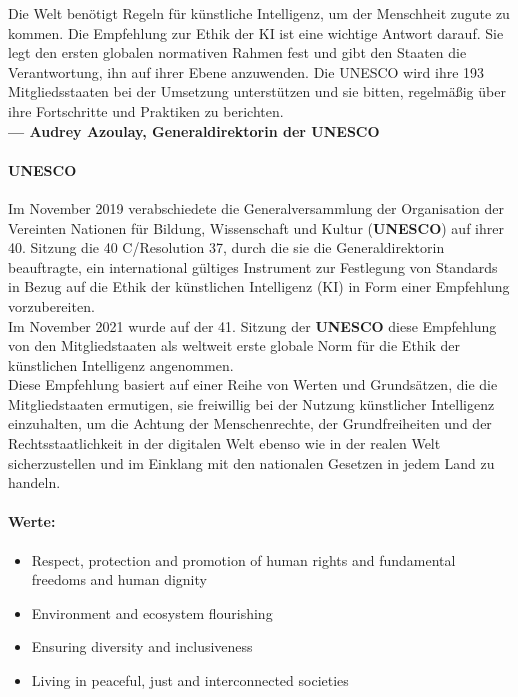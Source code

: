 \documentclass[12pt]{report}
\begin{document}


\glqq Die Welt benötigt Regeln für künstliche Intelligenz, um der Menschheit zugute zu kommen. Die Empfehlung zur Ethik der KI ist eine wichtige Antwort darauf. Sie legt den ersten globalen normativen Rahmen fest und gibt den Staaten die Verantwortung, ihn auf ihrer Ebene anzuwenden. Die UNESCO wird ihre 193 Mitgliedsstaaten bei der Umsetzung unterstützen und sie bitten, regelmäßig über ihre Fortschritte und Praktiken zu berichten.\glqq{} \\\textbf{--- Audrey Azoulay, Generaldirektorin der UNESCO}
\paragraph{UNESCO\cite{UNESCO}\\}
Im November 2019 verabschiedete die Generalversammlung der Organisation der Vereinten Nationen für Bildung, Wissenschaft und Kultur (\textbf{UNESCO}) auf ihrer 40. Sitzung die 40 C/Resolution 37, durch die sie die Generaldirektorin beauftragte, \glqq ein international gültiges Instrument zur Festlegung von Standards in Bezug auf die Ethik der künstlichen Intelligenz (KI) in Form einer Empfehlung vorzubereiten\glqq{}.\\Im November 2021 wurde auf der 41. Sitzung der \textbf{UNESCO} diese Empfehlung von den Mitgliedstaaten als weltweit erste globale Norm für die Ethik der künstlichen Intelligenz angenommen.\\

Diese Empfehlung basiert auf einer Reihe von Werten und Grundsätzen, die die Mitgliedstaaten ermutigen, sie freiwillig bei der Nutzung künstlicher Intelligenz einzuhalten, um die Achtung der Menschenrechte, der Grundfreiheiten und der Rechtsstaatlichkeit in der digitalen Welt ebenso wie in der realen Welt sicherzustellen und im Einklang mit den nationalen Gesetzen in jedem Land zu handeln.

\paragraph{Werte:}
\begin{itemize}
	\item Respect, protection and promotion of human rights and fundamental freedoms and human dignity
	\item Environment and ecosystem flourishing
	\item Ensuring diversity and inclusiveness
	\item Living in peaceful, just and interconnected societies
\end{itemize}
\end{document}

